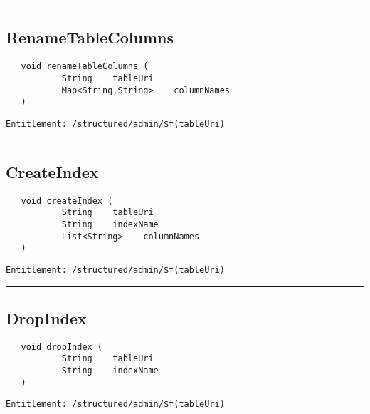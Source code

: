 \rule{12cm}{2pt}
\subsection{RenameTableColumns}
\label{Api:RenameTableColumns}
\begin{verbatim}
   void renameTableColumns (
           String    tableUri
           Map<String,String>    columnNames
   )
\end{verbatim}
\begin{Verbatim}[fontsize=\small, formatcom=\color{Maroon}]
  Entitlement: /structured/admin/$f(tableUri)
\end{Verbatim}



\rule{12cm}{2pt}
\subsection{CreateIndex}
\label{Api:CreateIndex}
\begin{verbatim}
   void createIndex (
           String    tableUri
           String    indexName
           List<String>    columnNames
   )
\end{verbatim}
\begin{Verbatim}[fontsize=\small, formatcom=\color{Maroon}]
  Entitlement: /structured/admin/$f(tableUri)
\end{Verbatim}



\rule{12cm}{2pt}
\subsection{DropIndex}
\label{Api:DropIndex}
\begin{verbatim}
   void dropIndex (
           String    tableUri
           String    indexName
   )
\end{verbatim}
\begin{Verbatim}[fontsize=\small, formatcom=\color{Maroon}]
  Entitlement: /structured/admin/$f(tableUri)
\end{Verbatim}



